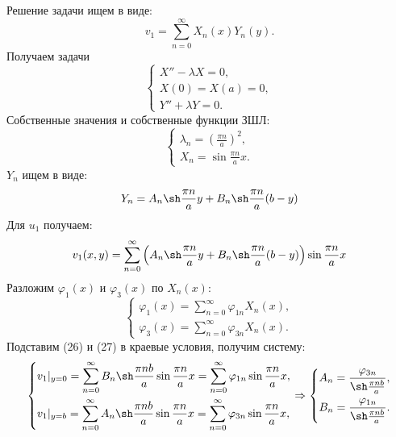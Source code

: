 \documentclass[11pt]{article}
\begin{document}
Решение задачи ищем в виде:
\begin{equation}
v_1 = \sum_{n = 0}^{\infty}X_n(x)Y_n(y).
\end{equation}
Получаем задачи
\begin{equation*}
\begin{cases}
X'' - \lambda X = 0, \\
X(0) = X(a) = 0, \\
Y'' + \lambda Y = 0.
\end{cases}
\end{equation*}
Собственные значения и собственные функции ЗШЛ:
\begin{equation*}
\begin{cases}
\lambda_n = \left(\frac{\pi n}a\right)^2, \\
X_n = \sin\frac{\pi n}ax.
\end{cases}
\end{equation*}
$Y_n$ ищем в виде:
\begin{equation*}
Y_n = A_n\sh\frac{\pi n}ay + B_n\sh\frac{\pi n}a(b - y)
\end{equation*}
Для $u_1$ получаем:
\begin{equation}
v_1(x, y) = \sum_{n = 0}^{\infty}\left(A_n\sh\frac{\pi n}ay + B_n\sh\frac{\pi n}a(b - y)\right)\sin\frac{\pi n}ax
\end{equation}
Разложим $\varphi_1(x)$ и $\varphi_3(x)$ по $X_n(x)$:
\begin{equation}
\begin{cases}
\varphi_1(x) = \sum_{n = 0}^{\infty}\varphi_{1n}X_n(x), \\
\varphi_3(x) = \sum_{n = 0}^{\infty}\varphi_{3n}X_n(x).
\end{cases}
\end{equation}
Подставим (26) и (27) в краевые условия, получим систему:
\begin{equation*}
\begin{dcases}
v_1|_{y = 0} = \sum_{n = 0}^{\infty}B_n\sh\frac{\pi nb}a\sin\frac{\pi n}ax = \sum_{n = 0}^{\infty}\varphi_{1n}\sin\frac{\pi n}ax, \\
v_1|_{y = b} = \sum_{n = 0}^{\infty}A_n\sh\frac{\pi nb}a\sin\frac{\pi n}ax = \sum_{n = 0}^{\infty}\varphi_{3n}\sin\frac{\pi n}ax,
\end{dcases}
\Rightarrow
\begin{dcases}
A_n = \frac{\varphi_{3n}}{\sh\frac{\pi nb}a}, \\
B_n = \frac{\varphi_{1n}}{\sh\frac{\pi nb}a}.
\end{dcases}
\end{equation*}
\end{document}
